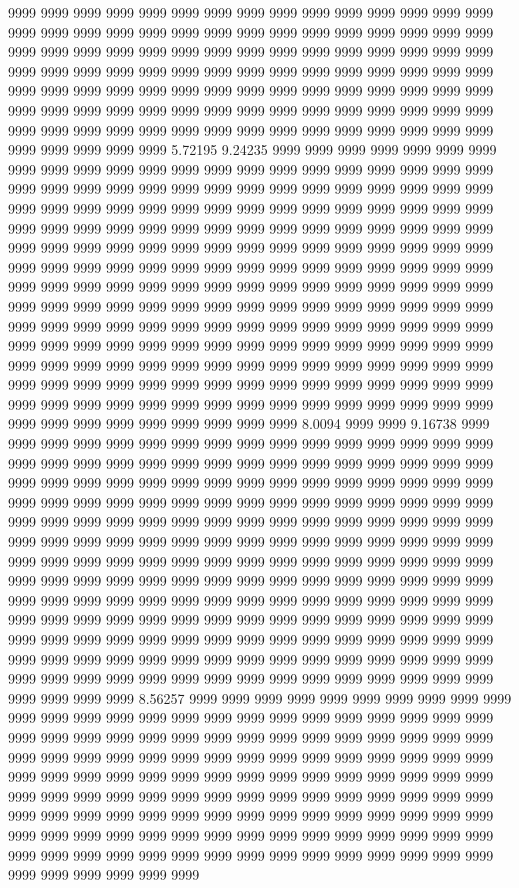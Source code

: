 9999 9999 9999 9999 9999 9999 9999 9999 9999 9999 9999 9999 9999 9999 9999 9999 9999 9999 9999 9999 9999 9999 9999 9999 9999 9999 9999 9999 9999 9999 9999 9999 9999 9999 9999 9999 9999 9999 9999 9999 9999 9999 9999 9999 9999 9999 9999 9999 9999 9999 9999 9999 9999 9999 9999 9999 9999 9999 9999 9999 9999 9999 9999 9999 9999 9999 9999 9999 9999 9999 9999 9999 9999 9999 9999 9999 9999 9999 9999 9999 9999 9999 9999 9999 9999 9999 9999 9999 9999 9999 9999 9999 9999 9999 9999 9999 9999 9999 9999 9999 9999 9999 9999 9999 9999 9999 9999 9999 9999 9999 5.72195 9.24235 9999 9999 9999 9999 9999 9999 9999 9999 9999 9999 9999 9999 9999 9999 9999 9999 9999 9999 9999 9999 9999 9999 9999 9999 9999 9999 9999 9999 9999 9999 9999 9999 9999 9999 9999 9999 9999 9999 9999 9999 9999 9999 9999 9999 9999 9999 9999 9999 9999 9999 9999 9999 9999 9999 9999 9999 9999 9999 9999 9999 9999 9999 9999 9999 9999 9999 9999 9999 9999 9999 9999 9999 9999 9999 9999 9999 9999 9999 9999 9999 9999 9999 9999 9999 9999 9999 9999 9999 9999 9999 9999 9999 9999 9999 9999 9999 9999 9999 9999 9999 9999 9999 9999 9999 9999 9999 9999 9999 9999 9999 9999 9999 9999 9999 9999 9999 9999 9999 9999 9999 9999 9999 9999 9999 9999 9999 9999 9999 9999 9999 9999 9999 9999 9999 9999 9999 9999 9999 9999 9999 9999 9999 9999 9999 9999 9999 9999 9999 9999 9999 9999 9999 9999 9999 9999 9999 9999 9999 9999 9999 9999 9999 9999 9999 9999 9999 9999 9999 9999 9999 9999 9999 9999 9999 9999 9999 9999 9999 9999 9999 9999 9999 9999 9999 9999 9999 9999 9999 9999 9999 9999 9999 9999 9999 9999 9999 9999 9999 9999 9999 9999 9999 9999 9999 9999 9999 9999 9999 9999 9999 9999 8.0094 9999 9999 9.16738 9999 9999 9999 9999 9999 9999 9999 9999 9999 9999 9999 9999 9999 9999 9999 9999 9999 9999 9999 9999 9999 9999 9999 9999 9999 9999 9999 9999 9999 9999 9999 9999 9999 9999 9999 9999 9999 9999 9999 9999 9999 9999 9999 9999 9999 9999 9999 9999 9999 9999 9999 9999 9999 9999 9999 9999 9999 9999 9999 9999 9999 9999 9999 9999 9999 9999 9999 9999 9999 9999 9999 9999 9999 9999 9999 9999 9999 9999 9999 9999 9999 9999 9999 9999 9999 9999 9999 9999 9999 9999 9999 9999 9999 9999 9999 9999 9999 9999 9999 9999 9999 9999 9999 9999 9999 9999 9999 9999 9999 9999 9999 9999 9999 9999 9999 9999 9999 9999 9999 9999 9999 9999 9999 9999 9999 9999 9999 9999 9999 9999 9999 9999 9999 9999 9999 9999 9999 9999 9999 9999 9999 9999 9999 9999 9999 9999 9999 9999 9999 9999 9999 9999 9999 9999 9999 9999 9999 9999 9999 9999 9999 9999 9999 9999 9999 9999 9999 9999 9999 9999 9999 9999 9999 9999 9999 9999 9999 9999 9999 9999 9999 9999 9999 9999 9999 9999 9999 9999 9999 9999 9999 9999 9999 9999 9999 9999 9999 9999 9999 9999 8.56257 9999 9999 9999 9999 9999 9999 9999 9999 9999 9999 9999 9999 9999 9999 9999 9999 9999 9999 9999 9999 9999 9999 9999 9999 9999 9999 9999 9999 9999 9999 9999 9999 9999 9999 9999 9999 9999 9999 9999 9999 9999 9999 9999 9999 9999 9999 9999 9999 9999 9999 9999 9999 9999 9999 9999 9999 9999 9999 9999 9999 9999 9999 9999 9999 9999 9999 9999 9999 9999 9999 9999 9999 9999 9999 9999 9999 9999 9999 9999 9999 9999 9999 9999 9999 9999 9999 9999 9999 9999 9999 9999 9999 9999 9999 9999 9999 9999 9999 9999 9999 9999 9999 9999 9999 9999 9999 9999 9999 9999 9999 9999 9999 9999 9999 9999 9999 9999 9999 9999 9999 9999 9999 9999 9999 9999 9999 9999 9999 9999 9999 9999 9999 9999 9999 9999 9999 